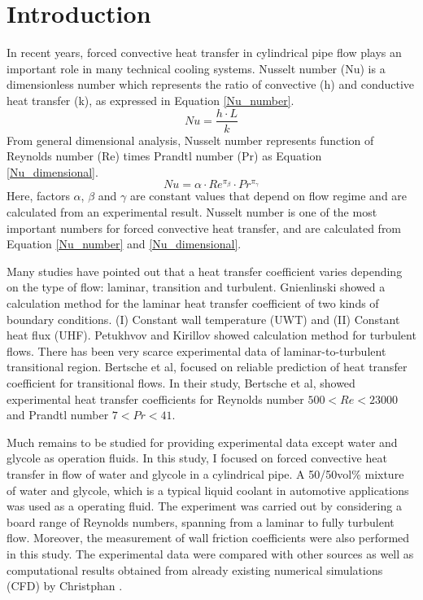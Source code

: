 \documentclass[conference]{IEEEtran}
\begin{document}
\section{Introduction}
In recent years, forced convective heat transfer in cylindrical pipe flow plays an important role in many technical cooling systems.
Nusselt number (Nu) is a dimensionless number which represents the ratio of convective (h) and conductive heat transfer (k), as expressed in Equation \eqref{Nu_number}.
\begin{equation}
Nu=\frac{h\cdot L}{k}\label{Nu_number}
\end{equation}
From general dimensional analysis, Nusselt number represents function of Reynolds number (Re) times Prandtl number (Pr) as Equation \eqref{Nu_dimensional}.
\begin{equation}
Nu=\alpha \cdot Re^{\pi_{\beta}}\cdot Pr^{\pi_{\gamma}}\label{Nu_dimensional}
\end{equation}
Here, factors $\alpha$, $\beta$ and $\gamma$ are constant values that depend on flow regime and are calculated from an experimental result.
Nusselt number is one of the most important numbers for forced convective heat transfer, and are calculated from Equation \eqref{Nu_number} and \eqref{Nu_dimensional}.

Many studies have pointed out that a heat transfer coefficient varies depending on the type of flow: laminar, transition and turbulent.
Gnienlinski\cite{Gnienlinski2010} showed a calculation method for the laminar heat transfer coefficient of two kinds of boundary conditions. (I) Constant wall temperature (UWT) and (I\hspace{-.1em}I) Constant heat flux (UHF).
Petukhvov and Kirillov\cite{Petukhov1958} showed calculation method for turbulent flows.
There has been very scarce experimental data of laminar-to-turbulent transitional region.
Bertsche et al,\cite{Bertsche2016} focused on reliable prediction of heat transfer coefficient for transitional flows.
In their study, Bertsche et al, showed experimental heat transfer coefficients for Reynolds number $500 < Re < 23000$ and Prandtl number $7 < Pr < 41$.

Much remains to be studied for providing experimental data except water and glycole as operation fluids.
In this study, I focused on forced convective heat transfer in flow of water and glycole in a cylindrical pipe.
A 50/50vol\% mixture of water and glycole, which is a typical liquid coolant in automotive applications was used as a operating fluid.
The experiment was carried out by considering a board range of Reynolds numbers, spanning from a laminar to fully turbulent flow.
Moreover, the measurement of wall friction coefficients were also performed in this study.
The experimental data were compared with other sources as well as computational results obtained from already existing numerical simulations (CFD) by Christphan \cite{Christphan2018}.
\end{document}
